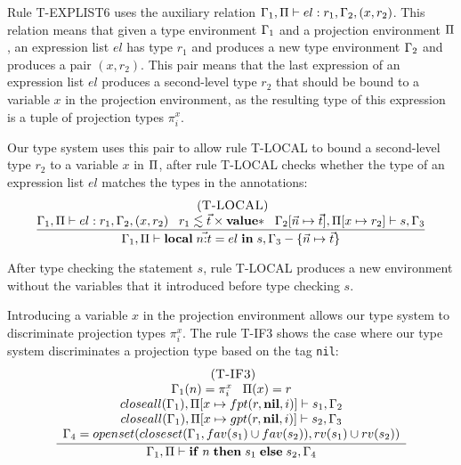 Rule \textsc{T-EXPLIST6} uses the auxiliary relation
$\Gamma_{1}, \Pi \vdash el : r_{1}, \Gamma_{2}, (x,r_{2})$.
This relation means that given a type environment $\Gamma_{1}$ and
a projection environment $\Pi$, an expression list $el$ has type
$r_{1}$ and produces a new type environment $\Gamma_{2}$ and
produces a pair $(x,r_{2})$.
This pair means that the last expression of an expression list $el$
produces a second-level type $r_{2}$ that should be bound to
a variable $x$ in the projection environment,
as the resulting type of this expression is a tuple of projection
types $\pi_{i}^{x}$.

Our type system uses this pair to allow rule \textsc{T-LOCAL} to bound
a second-level type $r_{2}$ to a variable $x$ in $\Pi$,
after rule \textsc{T-LOCAL} checks whether the type of an expression
list $el$ matches the types in the annotations:
\[
\begin{array}{c}
\; (\textsc{T-LOCAL})\\
\dfrac{\Gamma_{1}, \Pi \vdash el:r_{1}, \Gamma_{2}, (x,r_{2}) \;\;\;
       r_{1} \lesssim \vec{t} \times \mathbf{value}{*} \;\;\;
       \Gamma_{2}[\vec{n} \mapsto \vec{t}], \Pi[x \mapsto r_{2}] \vdash s, \Gamma_{3}}
      {\Gamma_{1}, \Pi \vdash \mathbf{local} \; \vec{n{:}t} = el \; \mathbf{in} \; s, \Gamma_{3} - \{\vec{n} \mapsto \vec{t}\}}
\end{array}
\]

After type checking the statement $s$, rule \textsc{T-LOCAL} produces a
new environment without the variables that it introduced before type checking $s$.

Introducing a variable $x$ in the projection environment allows our
type system to discriminate projection types $\pi_{i}^{x}$.
The rule \textsc{T-IF3} shows the case where our type system
discriminates a projection type based on the tag \texttt{nil}:
\[
\begin{array}{c}
\; (\textsc{T-IF3})\\
\dfrac{\begin{array}{c}
       \Gamma_{1}(n) = \pi_{i}^{x} \;\;\; \Pi(x) = r\\
       closeall(\Gamma_{1}), \Pi[x \mapsto fpt(r,\mathbf{nil},i)] \vdash s_{1}, \Gamma_{2} \\
       closeall(\Gamma_{1}), \Pi[x \mapsto gpt(r,\mathbf{nil},i)] \vdash s_{2}, \Gamma_{3} \\
       \Gamma_{4} = openset(closeset(\Gamma_{1}, fav(s_{1}) \cup fav(s_{2})),rv(s_{1}) \cup rv(s_{2}))
      \end{array}}
      {\Gamma_{1}, \Pi \vdash \mathbf{if} \; n \; \mathbf{then} \; s_{1} \; \mathbf{else} \; s_{2}, \Gamma_{4}}
\end{array}
\]

